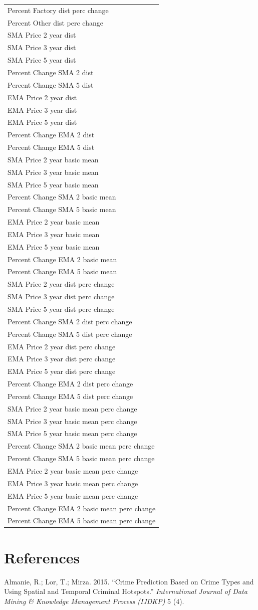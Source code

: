 \documentclass[]{article}
\begin{document}
\begin{longtable}[]{@{}l@{}}
Percent Factory dist perc change\tabularnewline
Percent Other dist perc change\tabularnewline
SMA Price 2 year dist\tabularnewline
SMA Price 3 year dist\tabularnewline
SMA Price 5 year dist\tabularnewline
Percent Change SMA 2 dist\tabularnewline
Percent Change SMA 5 dist\tabularnewline
EMA Price 2 year dist\tabularnewline
EMA Price 3 year dist\tabularnewline
EMA Price 5 year dist\tabularnewline
Percent Change EMA 2 dist\tabularnewline
Percent Change EMA 5 dist\tabularnewline
SMA Price 2 year basic mean\tabularnewline
SMA Price 3 year basic mean\tabularnewline
SMA Price 5 year basic mean\tabularnewline
Percent Change SMA 2 basic mean\tabularnewline
Percent Change SMA 5 basic mean\tabularnewline
EMA Price 2 year basic mean\tabularnewline
EMA Price 3 year basic mean\tabularnewline
EMA Price 5 year basic mean\tabularnewline
Percent Change EMA 2 basic mean\tabularnewline
Percent Change EMA 5 basic mean\tabularnewline
SMA Price 2 year dist perc change\tabularnewline
SMA Price 3 year dist perc change\tabularnewline
SMA Price 5 year dist perc change\tabularnewline
Percent Change SMA 2 dist perc change\tabularnewline
Percent Change SMA 5 dist perc change\tabularnewline
EMA Price 2 year dist perc change\tabularnewline
EMA Price 3 year dist perc change\tabularnewline
EMA Price 5 year dist perc change\tabularnewline
Percent Change EMA 2 dist perc change\tabularnewline
Percent Change EMA 5 dist perc change\tabularnewline
SMA Price 2 year basic mean perc change\tabularnewline
SMA Price 3 year basic mean perc change\tabularnewline
SMA Price 5 year basic mean perc change\tabularnewline
Percent Change SMA 2 basic mean perc change\tabularnewline
Percent Change SMA 5 basic mean perc change\tabularnewline
EMA Price 2 year basic mean perc change\tabularnewline
EMA Price 3 year basic mean perc change\tabularnewline
EMA Price 5 year basic mean perc change\tabularnewline
Percent Change EMA 2 basic mean perc change\tabularnewline
Percent Change EMA 5 basic mean perc change\tabularnewline
\bottomrule
\end{longtable}

\section*{References}\label{references}

\hypertarget{refs}{}
\hypertarget{ref-Almanie2015}{}
Almanie, R.; Lor, T.; Mirza. 2015. ``Crime Prediction Based on Crime
Types and Using Spatial and Temporal Criminal Hotspots.''
\emph{International Journal of Data Mining \& Knowledge Management
Process (IJDKP)} 5 (4).
\end{document}
